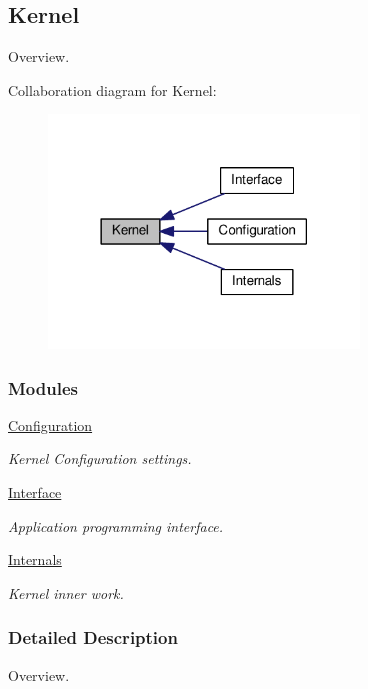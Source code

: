 \hypertarget{group__kernel}{\subsection{Kernel}
\label{group__kernel}
}


Overview.  


Collaboration diagram for Kernel\-:\nopagebreak
\begin{figure}[H]
\begin{center}
\leavevmode
\includegraphics[width=234pt]{group__kernel}
\end{center}
\end{figure}
\subsubsection*{Modules}
\begin{DoxyCompactItemize}
\item 
\hyperlink{group__kern__cfg}{Configuration}
\begin{DoxyCompactList}\small\item\em Kernel Configuration settings. \end{DoxyCompactList}\item 
\hyperlink{group__kern__intf}{Interface}
\begin{DoxyCompactList}\small\item\em Application programming interface. \end{DoxyCompactList}\item 
\hyperlink{group__kern__impl}{Internals}
\begin{DoxyCompactList}\small\item\em Kernel inner work. \end{DoxyCompactList}\end{DoxyCompactItemize}


\subsubsection{Detailed Description}
Overview. 